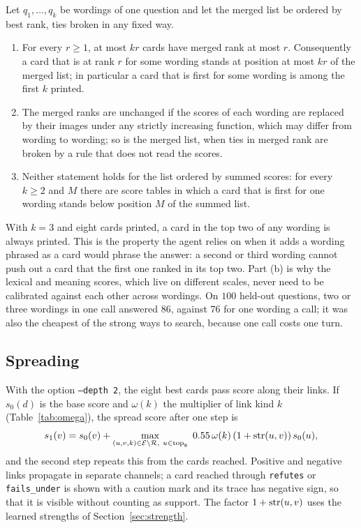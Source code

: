 \begin{proposition}\label{prop:merge}
Let $q_1,\dots,q_k$ be wordings of one question and let the merged list be ordered by best rank, ties broken in any fixed way.
\begin{enumerate}[label=(\alph*)]
\item For every $r\ge1$, at most $kr$ cards have merged rank at most $r$. Consequently a card that is at rank $r$ for some wording stands at position at most $kr$ of the merged list; in particular a card that is first for some wording is among the first $k$ printed.
\item The merged ranks are unchanged if the scores of each wording are replaced by their images under any strictly increasing function, which may differ from wording to wording; so is the merged list, when ties in merged rank are broken by a rule that does not read the scores.
\item Neither statement holds for the list ordered by summed scores: for every $k\ge2$ and $M$ there are score tables in which a card that is first for one wording stands below position $M$ of the summed list.
\end{enumerate}
\end{proposition}

With $k=3$ and eight cards printed, a card in the top two of any wording is always printed. This is the property the agent relies on when it adds a wording phrased as a card would phrase the answer: a second or third wording cannot push out a card that the first one ranked in its top two. Part (b) is why the lexical and meaning scores, which live on different scales, never need to be calibrated against each other across wordings. On $100$ held-out questions, two or three wordings in one call answered $86$, against $76$ for one wording a call; it was also the cheapest of the strong ways to search, because one call costs one turn.

\subsection{Spreading}
With the option \texttt{--depth 2}, the eight best cards pass score along their links. If $s_0(d)$ is the base score and $\omega(k)$ the multiplier of link kind $k$ (Table~\ref{tab:omega}), the spread score after one step is
\[
s_1(v)=s_0(v)+\max_{(u,v,k)\in\cE\setminus\cR,\ u\in\mathrm{top}_8}\ 0.55\,\omega(k)\,(1+\str(u,v))\,s_0(u),
\]
and the second step repeats this from the cards reached. Positive and negative links propagate in separate channels; a card reached through \texttt{refutes} or \texttt{fails\_under} is shown with a caution mark and its trace has negative sign, so that it is visible without counting as support. The factor $1+\operatorname{str}(u,v)$ uses the learned strengths of Section~\ref{sec:strength}.

